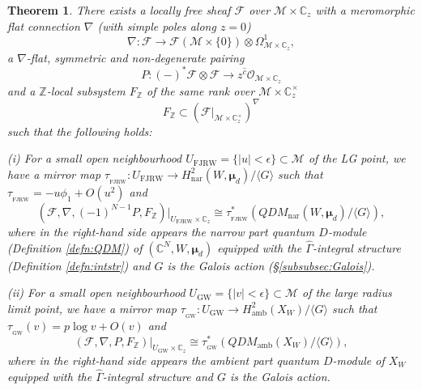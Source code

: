 \documentclass[11pt]{amsart}
\newtheorem{thm}{Theorem}[section] %
\theoremstyle{definition} %
\theoremstyle{remark} %
\newcommand{\CC}{\mathbb C}
\newcommand{\ZZ}{\mathbb Z}
\newcommand{\nar}{\operatorname{nar}}
\def\GW{\operatorname{\text{GW}}}
\newcommand{\bmu}{\boldsymbol{\mu}}
\newcommand{\cO}{\mathcal{O}}
\newcommand{\cM}{\mathcal{M}}
\newcommand{\cF}{\mathcal{F}}
\newcommand{\hc}{\hat{c}}
\newcommand{\amb}{\operatorname{amb}}
\newcommand{\FJRW}{{\operatorname{FJRW}}}
\newcommand{\sFJRW}{\operatorname{_{FJRW}}}
\renewcommand{\GW}{{\operatorname{GW}}}
\newcommand{\sGW}{\operatorname{_{GW}}}
\newcommand{\hGamma}{\widehat{\Gamma}}
\begin{document}
\begin{thm} 
\label{thm:main} 
There exists a locally free sheaf $\cF$ over $\cM \times \CC_z$ 
with a meromorphic flat connection $\nabla$ (with simple poles 
along $z=0$) 
\[
\nabla \colon \cF \to 
\cF(\cM\times \{0\}) \otimes \Omega_{\cM\times \CC_z}^1, 
\]
a $\nabla$-flat, symmetric and non-degenerate pairing 
\[
P \colon (-)^*\cF \otimes \cF \to z^{\hc} \cO_{\cM\times \CC_z} 
\]
and a $\ZZ$-local subsystem $F_\ZZ$ of the same rank 
over $\cM\times \CC_z^\times$ 
\[
F_\ZZ \subset (\cF|_{\cM \times \CC_z^\times})^\nabla 
\]
such that the following holds: 

{\rm (i)} For a small open neighbourhood 
$U_{\FJRW} = \{|u|<\epsilon\}\subset \cM$ of the LG point, 
we have a mirror map $\tau_{\sFJRW} \colon U_{\FJRW} \to 
H^2_{\nar}(W,\bmu_d)/\langle G\rangle$ 
such that $\tau_{\sFJRW} = -u \phi_1 + O(u^2)$ and 
\[
(\cF, \nabla, (-1)^{N-1}P, F_\ZZ) \Bigr |_{U_\FJRW \times \CC_z} 
\cong \tau_{\sFJRW}^* 
\left( QDM_{\nar}(W,\bmu_d) /\langle G\rangle \right),   
\]
where in the right-hand side appears 
the narrow part quantum $D$-module (Definition \ref{defn:QDM}) 
of $(\CC^N, W,\bmu_d)$ equipped with the $\hGamma$-integral 
structure (Definition \ref{defn:intstr}) 
and $G$ is the Galois action (\S \ref{subsubsec:Galois}). 

{\rm (ii)} For a small open neighbourhood 
$U_{\GW} = \{|v|<\epsilon\}\subset \cM$ 
of the large radius limit point, 
we have a mirror map 
$\tau_{\sGW} \colon U_\GW \to H^2_{\amb}(X_W)/\langle G\rangle$
such that $\tau_{\sGW}(v) = p \log v + O(v)$ and 
\[
(\cF, \nabla, P, F_\ZZ) \Bigr |_{U_\GW \times \CC_z} 
\cong \tau_{\sGW}^*\left( 
QDM_{\amb}(X_W)/\langle G\rangle \right),   
\] 
where in the right-hand side appears 
the ambient part quantum $D$-module of $X_W$ 
equipped with the $\hGamma$-integral structure
and $G$ is the Galois action.  
\end{thm} 
\end{document}
